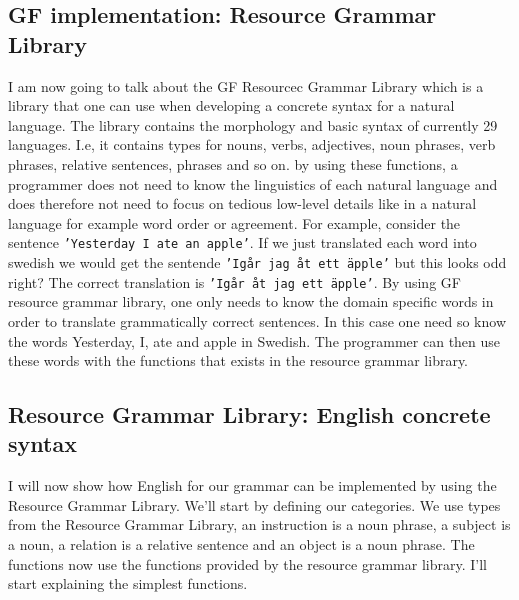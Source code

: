 \documentclass[
10pt, %
a4paper, %
oneside, %
headinclude,footinclude, %
BCOR5mm, %
]{scrartcl}
\begin{document}
\subsection{GF implementation: Resource Grammar Library}
I am now going to talk about the GF Resourcec Grammar Library which is a library that one can use when developing a concrete syntax for a natural language.
\newline
\newline
The library contains the morphology and basic syntax of currently 29 languages. 
\newline
\newline
I.e, it contains types for nouns, verbs, adjectives, noun phrases, verb phrases, relative sentences, phrases and so on. 
\newline
\newline
by using these functions, a programmer does not need to know the linguistics of each natural language and does therefore not need to focus on tedious low-level details like in a natural language for example word order or agreement.
\newline
\newline
For example, consider the sentence \texttt{'Yesterday I ate an apple'}. If we just translated each word into swedish we would get the sentende \texttt{'Igår jag åt ett äpple'} but this looks odd right?
\newline
\newline
The correct translation is \texttt{'Igår åt jag ett äpple'}.
\newline
\newline
By using GF resource grammar library, one only needs to know the domain specific words in order to translate grammatically correct sentences. In this case one need so know the words Yesterday, I, ate and apple in Swedish. The programmer can then use these words with the functions that exists in the resource grammar library.

\subsection{Resource Grammar Library: English concrete syntax}
I will now show how English for our grammar can be implemented by using the Resource Grammar Library.
\newline
\newline
We'll start by defining our categories. We use types from the Resource Grammar Library, an instruction is a noun phrase, a subject is a noun, a relation is a relative sentence and an object is a noun phrase.
\newline
\newline
The functions now use the functions provided by the resource grammar library. I'll start explaining the simplest functions. 
\end{document}
